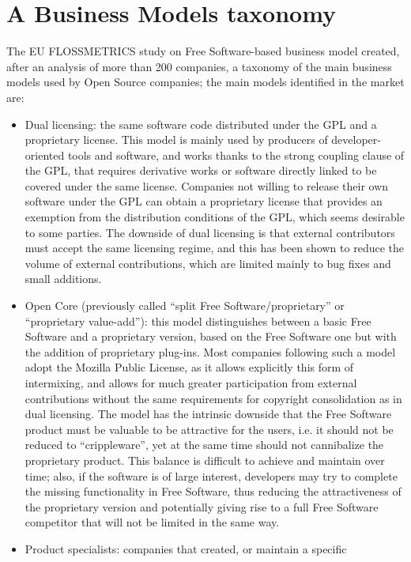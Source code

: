 \section*{A Business Models taxonomy}

The EU FLOSSMETRICS study on Free Software-based business model created, after
an analysis of more than 200 companies, a taxonomy of the main business models
used by Open Source companies; the main models identified in the market are: 
\begin{itemize}
 \item Dual licensing: the same software code distributed under the GPL and a
proprietary license. This model is mainly used by producers of
developer-oriented tools and software, and works thanks to the strong coupling
clause of the GPL, that requires derivative works or software directly linked to
be covered under the same license. Companies not willing to release their own
software under the GPL can obtain a proprietary license that provides an
exemption from the distribution conditions of the GPL, which seems desirable to
some parties. The downside of dual licensing is that external contributors must
accept the same licensing regime, and this has been shown to reduce the volume
of external contributions, which are limited mainly to bug fixes and small
additions.
 \item Open Core (previously called “split Free Software/proprietary” or
“proprietary value-add”): this model distinguishes between a basic Free Software
and a proprietary version, based on the Free Software one but with the addition
of proprietary plug-ins. Most companies following such a model adopt the Mozilla
Public License, as it allows explicitly this form of intermixing, and allows for
much greater participation from external contributions without the same
requirements for copyright consolidation as in dual licensing. The model has the
intrinsic downside that the Free Software product must be valuable to be
attractive for the users, i.e. it should not be reduced to “crippleware”, yet at
the same time should not cannibalize the proprietary product. This balance is
difficult to achieve and maintain over time; also, if the software is of large
interest, developers may try to complete the missing functionality in Free
Software, thus reducing the attractiveness of the proprietary version and
potentially giving rise to a full Free Software competitor that will not be
limited in the same way.
 \item Product specialists: companies that created, or maintain a specific

\end{itemize}
